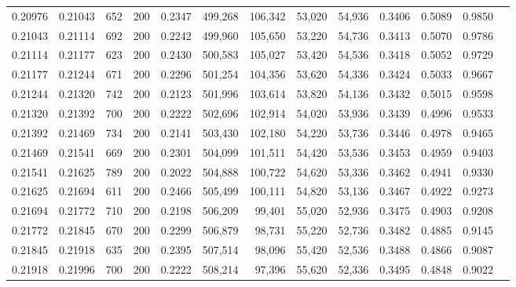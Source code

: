 \begin{tabular}{rrrrrrrrrrrrr}
0.20976 & 0.21043 &    652 & 200 &                                     0.2347 & 499,268 & 106,342 &  53,020 &  54,936 & 0.3406 & 0.5089 & 0.9850 \\
0.21043 & 0.21114 &    692 & 200 &                                     0.2242 & 499,960 & 105,650 &  53,220 &  54,736 & 0.3413 & 0.5070 & 0.9786 \\
0.21114 & 0.21177 &    623 & 200 &                                     0.2430 & 500,583 & 105,027 &  53,420 &  54,536 & 0.3418 & 0.5052 & 0.9729 \\
0.21177 & 0.21244 &    671 & 200 &                                     0.2296 & 501,254 & 104,356 &  53,620 &  54,336 & 0.3424 & 0.5033 & 0.9667 \\
0.21244 & 0.21320 &    742 & 200 &                                     0.2123 & 501,996 & 103,614 &  53,820 &  54,136 & 0.3432 & 0.5015 & 0.9598 \\
0.21320 & 0.21392 &    700 & 200 &                                     0.2222 & 502,696 & 102,914 &  54,020 &  53,936 & 0.3439 & 0.4996 & 0.9533 \\
0.21392 & 0.21469 &    734 & 200 &                                     0.2141 & 503,430 & 102,180 &  54,220 &  53,736 & 0.3446 & 0.4978 & 0.9465 \\
0.21469 & 0.21541 &    669 & 200 &                                     0.2301 & 504,099 & 101,511 &  54,420 &  53,536 & 0.3453 & 0.4959 & 0.9403 \\
0.21541 & 0.21625 &    789 & 200 &                                     0.2022 & 504,888 & 100,722 &  54,620 &  53,336 & 0.3462 & 0.4941 & 0.9330 \\
0.21625 & 0.21694 &    611 & 200 &                                     0.2466 & 505,499 & 100,111 &  54,820 &  53,136 & 0.3467 & 0.4922 & 0.9273 \\
0.21694 & 0.21772 &    710 & 200 &                                     0.2198 & 506,209 &  99,401 &  55,020 &  52,936 & 0.3475 & 0.4903 & 0.9208 \\
0.21772 & 0.21845 &    670 & 200 &                                     0.2299 & 506,879 &  98,731 &  55,220 &  52,736 & 0.3482 & 0.4885 & 0.9145 \\
0.21845 & 0.21918 &    635 & 200 &                                     0.2395 & 507,514 &  98,096 &  55,420 &  52,536 & 0.3488 & 0.4866 & 0.9087 \\
0.21918 & 0.21996 &    700 & 200 &                                     0.2222 & 508,214 &  97,396 &  55,620 &  52,336 & 0.3495 & 0.4848 & 0.9022 \\

\end{tabular}
